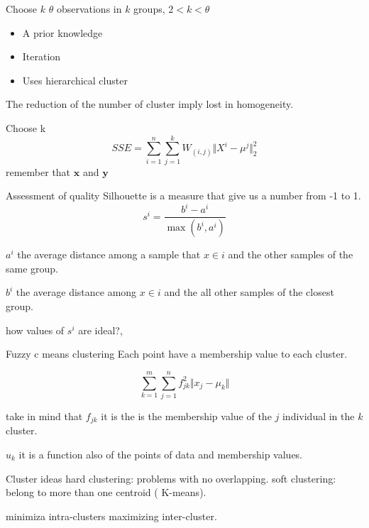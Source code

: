 \documentclass{beamer}
\begin{document}
\begin{frame}{Choose $k$}
$\theta$ observations in $k$ groups, 
$ 2< k < \theta$
\begin{itemize}
\item A prior knowledge
\item Iteration 
\item Uses hierarchical cluster 
\end{itemize}
The reduction of the number of cluster imply lost in homogeneity.
\end{frame}



\begin{frame}{Choose k}
\begin{equation}
SSE = \sum_{i=1}^{n} \sum_{j=1}^{k} W_{(i,j)} \Vert X^{i} - \mu^{j} \Vert^{2}_{2}
\end{equation}
remember that $\bm{x}$ and $\bm{y}$ 
\end{frame}


\begin{frame}{Assessment of quality}
Silhouette is a measure that give us a number from -1 to 1. 
\begin{equation}
s^{i} = \frac{b^{i} - a^{i}}{\max(b^{i} , a^{i})}
\end{equation}

$a^{i}$  the average distance among a sample that $x \in i$ and the other samples of the same group.

$b^{i}$  the average distance among $x \in i$ and the all other samples of the closest group.

how values of $s^{i}$ are ideal?,

\end{frame}


\begin{frame}{Fuzzy c means clustering}
Each point have a membership value to each cluster.

\begin{equation}
\sum_{k=1}^{m} \sum_{j=1}^{n} f_{jk}^{2} \Vert x_{j} - \mu_{k} \Vert 
\end{equation}

take in mind that $f_{jk}$ it is the is the membership value of the $j$ individual in the $k$ cluster.

$u_{k}$ it is a function also of the points  of data and membership values.

\end{frame}



\begin{frame}{Cluster ideas}
hard clustering: problems with no overlapping.
soft clustering: belong to more than one centroid ( K-means).


minimiza intra-clusters maximizing inter-cluster.


\end{frame}
\end{document}
